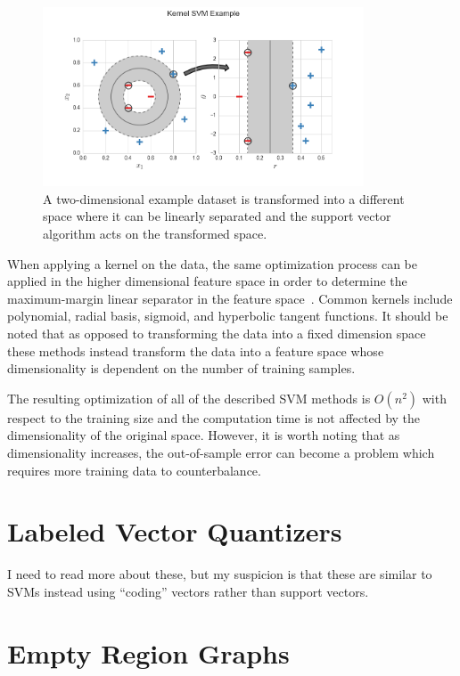 \documentclass[12pt]{article}
\begin{document}
\begin{figure}[!ht]
  \centering
  \includegraphics[width=0.85\textwidth]{figs/chap3/kernelSvmExample}
  \caption[Kernel Support Vector Machine Example]{A two-dimensional example
  dataset is transformed into a different space where it can be linearly
  separated and the support vector algorithm acts on the transformed space.}
  \label{fig:kernelSvmExample}
\end{figure}

When applying a kernel on the data, the same optimization process can be applied
in the higher dimensional feature space in order to determine the maximum-margin
linear separator in the feature space~\cite{BoserGuyonVapnik1992}.
%
Common kernels include polynomial, radial basis, sigmoid, and hyperbolic tangent
functions.
%
It should be noted that as opposed to transforming the data into a fixed
dimension space these methods instead transform the data into a feature space
whose dimensionality is dependent on the number of training samples.

The resulting optimization of all of the described SVM methods is $O(n^2)$ with
respect to the training size and the computation time is not affected by the
dimensionality of the original space.
%
However, it is worth noting that as dimensionality increases, the out-of-sample
error can become a problem which requires more training data to counterbalance.

\section{Labeled Vector Quantizers}

I need to read more about these, but my suspicion is that these are similar to
SVMs instead using ``coding'' vectors rather than support vectors.

\section{Empty Region Graphs}
\end{document}
